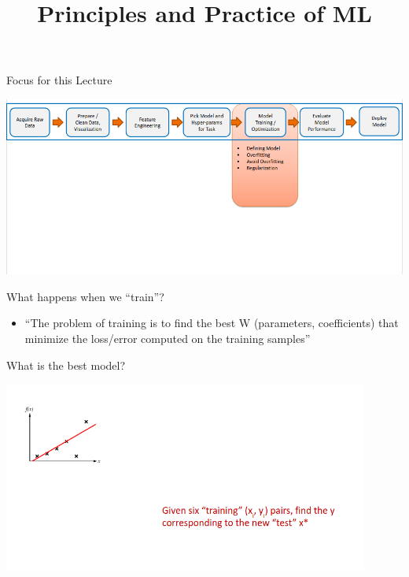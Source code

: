 \documentclass[aspectratio=169,14pt,usenames,dvipsnames]{beamer}
\begin{document}
\begin{frame}{Focus for this Lecture}

\includegraphics[width=1.0\textwidth, height=0.7\textheight]{Images/AIML_OFG_1.png}
\end{frame}


{\1
\begin{frame} \vspace{35pt}
	\title[Principles and Practice of ML]{Principles and Practice of ML}
	\maketitle
\end{frame}
}


\begin{frame}{What happens when we “train”?}
\begin{itemize}
\item “The problem of training is to find the best W (parameters, coefficients) that minimize the loss/error computed on the training samples”
\end{itemize}

\end{frame}


\begin{frame}{What is the best model?}

\includegraphics[width=0.9\textwidth, height=0.8\textheight]{Images/AIML_OFG_2.png}

\end{frame}
\end{document}
